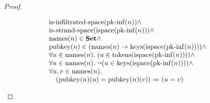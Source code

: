 \documentclass[11pt]{article}
\theoremstyle{plain}
\begin{document}
\begin{proof}
\begin{itemize}[leftmargin=2.8em, itemsep=4pt, parsep=1pt]
\begin{equation*}
\begin{array}{@{}l@{}} \operatorname{is\text{-}infiltrated\text{-}space}(\operatorname{pk\text{-}inf}(n)) \wedge \\ \operatorname{is\text{-}strand\text{-}space}(\operatorname{ispace}(\operatorname{pk\text{-}inf}(n))) \wedge \\ \operatorname{names}(n) \in \mathbf{Set} \wedge \\ \operatorname{pubkey}(n) \in (\operatorname{names}(n) \to \operatorname{keys}(\operatorname{ispace}(\operatorname{pk\text{-}inf}(n)))) \wedge \\ \forall u \in \operatorname{names}(n).\; (u \in \operatorname{tokens}(\operatorname{ispace}(\operatorname{pk\text{-}inf}(n)))) \wedge \\ \forall u \in \operatorname{names}(n).\; \neg (u \in \operatorname{keys}(\operatorname{ispace}(\operatorname{pk\text{-}inf}(n)))) \wedge \\ \forall u, v \in \operatorname{names}(n). \\ \quad (\operatorname{pubkey}(n)(u) = \operatorname{pubkey}(n)(v)) \Rightarrow (u = v) \end{array}
\end{equation*}


\end{itemize}
\end{proof}
\end{document}
